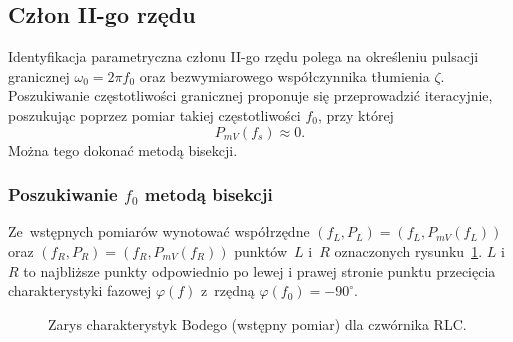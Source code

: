 \documentclass[paper=a4,DIV=12]{lpas}
\newcommand{\degree}{^{\circ}}
\begin{document}
\begin{appendices}
  \subsection{Człon II-go rzędu}
  \label{sec:YDUPM}

  Identyfikacja parametryczna członu II-go rzędu polega na określeniu pulsacji
  granicznej $\omega_0 = 2 \pi f_0$ oraz bezwymiarowego współczynnika tłumienia
  $\zeta$. Poszukiwanie częstotliwości granicznej proponuje się przeprowadzić
  iteracyjnie, poszukując poprzez pomiar takiej częstotliwości $f_0$, przy
  której
  \begin{equation}
    P_{mV}(f_s) \approx 0.
    \label{eq:8AO8B}
  \end{equation}
  Można tego dokonać metodą bisekcji.

  \subsubsection{Poszukiwanie $f_0$ metodą bisekcji}
  \label{sec:HVY4X}

  Ze~wstępnych pomiarów wynotować współrzędne $(f_L, P_L) = (f_L, P_{mV}(f_L))$
  oraz $(f_R, P_R) = (f_R, P_{mV}(f_R))$ punktów~$L$ i~$R$ oznaczonych
  rysunku~\ref{fig:WC8TU}. $L$ i~$R$ to najbliższe punkty odpowiednio po lewej
  i prawej stronie punktu przecięcia charakterystyki fazowej $\varphi(f)$
  z~rzędną $\varphi(f_0) = - 90\degree$.

  \begin{figure}[H]
    \centering
    
    \caption{Zarys charakterystyk Bodego (wstępny pomiar) dla czwórnika RLC.}
    \label{fig:WC8TU}
  \end{figure}


\end{appendices}
\end{document}
